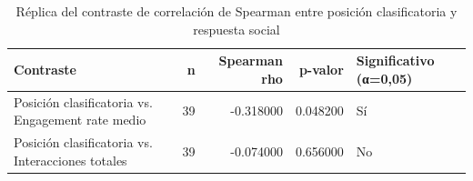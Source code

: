 \begin{table}
\caption{Réplica del contraste de correlación de Spearman entre posición clasificatoria y respuesta social}
\label{tab:replica_berraquero}
\begin{tabular}{lrrrl}
\toprule
Contraste & n & Spearman rho & p-valor & Significativo (α=0,05) \\
\midrule
Posición clasificatoria vs. Engagement rate medio & 39 & -0.318000 & 0.048200 & Sí \\
Posición clasificatoria vs. Interacciones totales & 39 & -0.074000 & 0.656000 & No \\
\bottomrule
\end{tabular}
\end{table}
